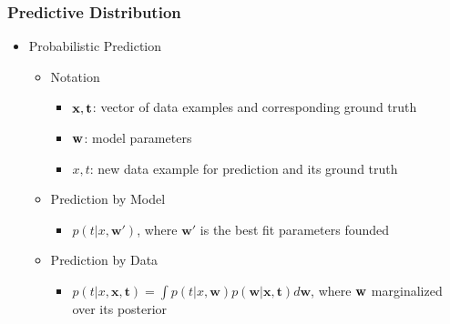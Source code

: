 \subsubsection{Predictive Distribution}
\begin{itemize}	
\item Probabilistic Prediction
	\begin{itemize}
	\item Notation
		\begin{itemize}
		\item $\bf x, \bf t$: vector of data examples and corresponding ground truth
		\item $\bf w$: model parameters
		\item $x, t$: new data example for prediction and its ground truth
		\end{itemize}
	\item Prediction by Model
		\begin{itemize}
		\item $p(t|x, \mathbf{w}')$, where $\mathbf w'$ is the best fit parameters founded
		\end{itemize}
	\item Prediction by Data
		\begin{itemize}
		\item $\displaystyle p(t|x,\mathbf{x},\mathbf{t}) = \int p(t|x,\mathbf{w})p(\mathbf{w}|\mathbf{x},\mathbf{t}) d\mathbf w$, where $\bf w$ marginalized over its posterior 
		\end{itemize}
	\end{itemize}
\end{itemize}